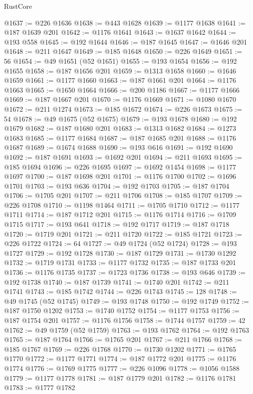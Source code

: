 \begin{lexlean}{RustCore}
\begin{coremodule}
@1637 := @226 @1636
@1638 := @443 @1628
@1639 := @1177 @1638
@1641 := @187 @1639 @201
@1642 := @1176 @1641
@1643 := @1637 @1642
@1644 := @193 @558
@1645 := @192 @1644
@1646 := @187 @1645
@1647 := @1646 @201
@1648 := @211 @1647
@1649 := @185 @1648
@1650 := @226 @1649
@1651 := 56
@1654 := @49 @1651 (@52 @1651)
@1655 := @193 @1654
@1656 := @192 @1655
@1658 := @187 @1656 @201
@1659 := @1313 @1658
@1660 := @1646 @1659
@1661 := @1177 @1660
@1663 := @187 @1661 @201
@1664 := @1176 @1663
@1665 := @1650 @1664
@1666 := @200 @1186
@1667 := @1177 @1666
@1669 := @187 @1667 @201
@1670 := @1176 @1669
@1671 := @1080 @1670
@1672 := @211 @1274
@1673 := @185 @1672
@1674 := @226 @1673
@1675 := 54
@1678 := @49 @1675 (@52 @1675)
@1679 := @193 @1678
@1680 := @192 @1679
@1682 := @187 @1680 @201
@1683 := @1313 @1682
@1684 := @1273 @1683
@1685 := @1177 @1684
@1687 := @187 @1685 @201
@1688 := @1176 @1687
@1689 := @1674 @1688
@1690 := @193 @616
@1691 := @192 @1690
@1692 := @187 @1691
@1693 := @1692 @201
@1694 := @211 @1693
@1695 := @185 @1694
@1696 := @226 @1695
@1697 := @1692 @1454
@1698 := @1177 @1697
@1700 := @187 @1698 @201
@1701 := @1176 @1700
@1702 := @1696 @1701
@1703 := @193 @636
@1704 := @192 @1703
@1705 := @187 @1704
@1706 := @1705 @201
@1707 := @211 @1706
@1708 := @185 @1707
@1709 := @226 @1708
@1710 := @1198 @1464
@1711 := @1705 @1710
@1712 := @1177 @1711
@1714 := @187 @1712 @201
@1715 := @1176 @1714
@1716 := @1709 @1715
@1717 := @193 @641
@1718 := @192 @1717
@1719 := @187 @1718
@1720 := @1719 @201
@1721 := @211 @1720
@1722 := @185 @1721
@1723 := @226 @1722
@1724 := 64
@1727 := @49 @1724 (@52 @1724)
@1728 := @193 @1727
@1729 := @192 @1728
@1730 := @187 @1729
@1731 := @1730 @1292
@1732 := @1719 @1731
@1733 := @1177 @1732
@1735 := @187 @1733 @201
@1736 := @1176 @1735
@1737 := @1723 @1736
@1738 := @193 @646
@1739 := @192 @1738
@1740 := @187 @1739
@1741 := @1740 @201
@1742 := @211 @1741
@1743 := @185 @1742
@1744 := @226 @1743
@1745 := 128
@1748 := @49 @1745 (@52 @1745)
@1749 := @193 @1748
@1750 := @192 @1749
@1752 := @187 @1750 @1202
@1753 := @1740 @1752
@1754 := @1177 @1753
@1756 := @187 @1754 @201
@1757 := @1176 @1756
@1758 := @1744 @1757
@1759 := 42
@1762 := @49 @1759 (@52 @1759)
@1763 := @193 @1762
@1764 := @192 @1763
@1765 := @187 @1764
@1766 := @1765 @201
@1767 := @211 @1766
@1768 := @185 @1767
@1769 := @226 @1768
@1770 := @1730 @1202
@1771 := @1765 @1770
@1772 := @1177 @1771
@1774 := @187 @1772 @201
@1775 := @1176 @1774
@1776 := @1769 @1775
@1777 := @226 @1096
@1778 := @1056 @1588
@1779 := @1177 @1778
@1781 := @187 @1779 @201
@1782 := @1176 @1781
@1783 := @1777 @1782

\end{coremodule}
\end{lexlean}

